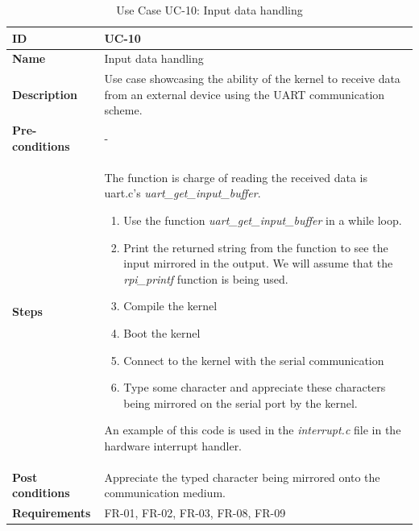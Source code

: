 \begin{table}[H]
    \centering
    \begin{tabular}{| p{3cm} | p{7cm} |}
    \hline
    \textbf{ID}             & UC-10 \\ \hline
    \textbf{Name}           & Input data handling\\ \hline
    \textbf{Description}    & Use case showcasing the ability of the kernel to receive data from an external device using the UART communication scheme.
	\\ \hline
    \textbf{Pre-conditions} & - \\ \hline
    \textbf{Steps}          &  The function is charge of reading the received data is uart.c's \textit{uart\_get\_input\_buffer}.
    							 \begin{enumerate}
    							 	\item Use the function \textit{uart\_get\_input\_buffer} in a while loop.
    							 	\item Print the returned string from the function to see the input mirrored in the output. We will assume that the \textit{rpi\_printf} function is being used.
                                  \item Compile the kernel
                                	\item Boot the kernel
                                	\item Connect to the kernel with the serial communication
                                	\item Type some character and appreciate these characters being mirrored on the serial port by the kernel.
                                \end{enumerate}
                                An example of this code is used in the \textit{interrupt.c} file in the hardware interrupt handler.
 \\ \hline
    \textbf{Post conditions} & 	Appreciate the typed character being mirrored onto the communication medium.
    							   	\\ \hline
    \textbf{Requirements}       & FR-01, FR-02, FR-03, FR-08, FR-09  \\ \hline
    \end{tabular}
    \caption{Use Case UC-10: Input data handling}
\end{table}


